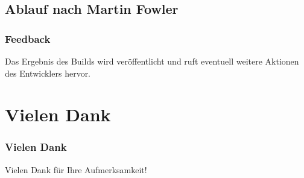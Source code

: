\documentclass[hyperref={pdfpagelabels=false}]{beamer}
\begin{document}
\subsection{Ablauf nach Martin Fowler}
\begin{frame} [t]
\frametitle{Feedback}
\begin{figure}[h]
  \centering
\end{figure}
\vspace{0.5cm} 
Das Ergebnis des Builds wird veröffentlicht und ruft eventuell weitere Aktionen des Entwicklers hervor.
\end{frame}
\fi
\section*{Vielen Dank}

\begin{frame} 
\frametitle{Vielen Dank}

\begin{center}
\Huge{Vielen Dank für Ihre Aufmerksamkeit!}
\end{center}

\end{frame}
\end{document}
